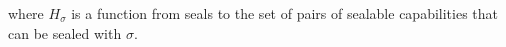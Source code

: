 \documentclass[a4paper]{article}
\begin{document}

where $H_\sigma$ is a function from seals to the set of pairs of sealable capabilities that can be sealed with $\sigma$.
\end{document}

